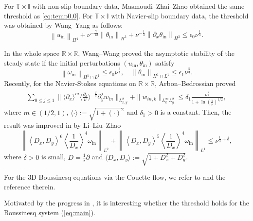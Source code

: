 \documentclass[reqno, 12pt]{amsart} %
\theoremstyle{plain} %
\theoremstyle{definition}
\theoremstyle{remark}
\numberwithin{equation}{section} %
\newcommand{\beno}{\begin{eqnarray*}}
\newcommand{\eeno}{\end{eqnarray*}}
\begin{document}
    For $\mathbb{T} \times \mathbb{I}$ with non-slip boundary data, Masmoudi--Zhai--Zhao \cite{MZZ2023} obtained the same threshold as \eqref{eq:temp0.0}. For $\mathbb{T} \times \mathbb{I}$ with Navier-slip boundary data, the threshold was obtained by Wang--Yang \cite{WY2024} as follows:
	$$
	\left\|u_{\text{in}}\right\|_{H^{4}}  + \nu^{-\frac{7}{12}}\left\|\theta_{\text{in}}\right\|_{H^3} + \nu^{-\frac13}\left\|\partial_x \theta_{\text{in}}\right\|_{H^3} \leq \epsilon_0 \nu^{\frac{1}{3}}.
	$$
    

    In the whole space $\mathbb{R} \times \mathbb{R}$, Wang--Wang \cite{WW202502} proved the asymptotic stability of the steady state if the initial perturbations $(u_{\mathrm{in}}, \theta_{\mathrm{in}})$ satisfy
	$$
	\left\|\omega_{\mathrm{in}}\right\|_{H^1 \cap L^1} \leq \epsilon_0 \nu^{\frac{3}{4}}, \quad\left\|\theta_{\mathrm{in}}\right\|_{H^1 \cap L^1} \leq \epsilon_1 \nu^{\frac{5}{4}}.
	$$
Recently, for the Navier-Stokes equations on $\mathbb{R} \times \mathbb{R}$, Arbon--Bedrossian \cite{AB2024} proved
       \beno
        \sum_{0\leq j\leq 1}\|\langle\partial_x\rangle ^m\langle\frac{\partial_x}{\nu}\rangle^{-\frac{j}{3}}\partial_y^jw_{in}\|_{L^2_{x,y}}+\|w_{in,k}\|_{L^\infty_k L_y^2}\leq \delta_1 \frac{\nu^{\frac12}}{1+\ln(\frac{1}{\nu})^{1/2}},
        \eeno
        where $m\in (1/2,1)$, $\langle \cdot \rangle:=\sqrt{1 + (\cdot)^2}$ and $\delta_1>0 $ is a constant.
        Then, the result was improved in \cite{LLZ2025} by
        Li--Liu--Zhao 
		$$
		\left\|\left\langle D_x, D_y\right\rangle^6\left\langle\frac{1}{D_x}\right\rangle^4 \omega_{\mathrm{in}}\right\|_{L^2}+\left\|\left\langle D_x, D_y\right\rangle^5\left\langle\frac{1}{D_x}\right\rangle^4 \omega_{\mathrm{in}}\right\|_{L^1} \leq \nu^{\frac{1}{3}+\delta},
		$$
		where $\delta>0$ is small, $D = \frac1i \partial$  and $\langle D_x, D_y\rangle:=\sqrt{1 + D_x^2 + D_y^2}$.

For the 3D Boussinesq equations via the Couette flow, we refer to \cite{ZZ2025,ZZW2024,CWW202501} and the reference therein. 


    Motivated by the progress in \cite{LLZ2025}, it is interesting whether the  threshold holds for the Boussinesq system (\ref{eq:main}).  
\end{document}
